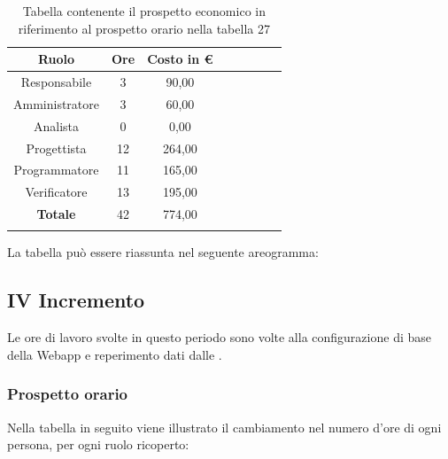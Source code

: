 			\begin{longtable}{|c|c|c|c|c|c|c|c}
				\hline
				\rowcolor{lighter-grayer}
				\textbf{Ruolo} & \textbf{Ore} & \textbf{Costo in €} \\
				\hline
				\endfirsthead
				\hline
			Responsabile 	    & 3 & 90,00\\
			\hline 
			\hline
			Amministratore	  & 3 & 60,00\\
			\hline
			\hline
			Analista 				& 0 & 0,00\\
			\hline
			\hline
			Progettista 		  & 12 & 264,00\\
			\hline
			\hline
			Programmatore 	 & 11 & 165,00\\
			\hline
			\hline
			Verificatore 		  & 13 & 195,00\\
			\hline
			\textbf{Totale} 	& 42 & 774,00\\
			\hline 
				
				\caption{Tabella contenente il prospetto economico in riferimento al prospetto orario nella tabella 27}
			\end{longtable}
			\pagebreak
			
			La tabella può essere riassunta nel seguente areogramma:

		
		\subsection{IV Incremento}
		Le ore di lavoro svolte in questo periodo sono volte alla configurazione di base della Webapp e reperimento dati dalle .
		\subsubsection{Prospetto orario}
			Nella tabella in seguito viene illustrato il cambiamento nel numero d'ore di ogni persona, per ogni ruolo ricoperto:
			
